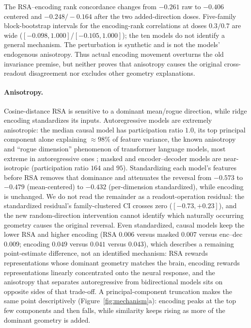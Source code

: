 \documentclass{article}
\begin{document}
The RSA--encoding rank concordance changes from $-0.261$ raw to $-0.406$ centered and
$-0.248/-0.164$ after the two added-direction doses. Five-family block-bootstrap intervals
for the encoding-rank correlations at doses $0.3/0.7$ are wide
($[-0.098,1.000]$/$[-0.105,1.000]$); the ten models do not identify a general mechanism.
The perturbation is synthetic and is not the models' endogenous anisotropy. Thus actual
encoding movement overturns the old invariance premise, but neither proves that anisotropy
causes the original cross-readout disagreement nor excludes other geometry explanations.

\paragraph{Anisotropy.} Cosine-distance RSA is sensitive to a dominant mean/rogue direction, while
ridge encoding standardizes its inputs. Autoregressive models are extremely anisotropic: the median
causal model has participation ratio $1.0$, its top principal component alone explaining
$\approx 98\%$ of feature variance, the known anisotropy and ``rogue dimension'' phenomenon of
transformer language models, most extreme in autoregressive ones \citep{ethayarajh2019contextual,
timkey2021rogue, gao2019degeneration}; masked and
encoder--decoder models are near-isotropic (participation ratio $164$ and $95$). Standardizing each
model's features before RSA removes that dominance and attenuates the reversal from $-0.573$ to
$-0.479$ (mean-centered) to $-0.432$ (per-dimension standardized), while encoding is unchanged. We do
not read the remainder as a readout-operation residual: the standardized residual's
family-clustered CI crosses zero ($[-0.73, +0.23]$), and the new random-direction
intervention cannot identify which naturally occurring geometry causes the original reversal.
Even standardized, causal models keep the lower RSA and higher encoding (RSA $0.006$ versus
masked $0.007$ versus enc--dec $0.009$; encoding $0.049$ versus $0.041$ versus $0.043$), which describes a remaining point-estimate difference, not an identified mechanism: RSA rewards
representations whose dominant geometry matches the brain, encoding rewards representations linearly
concentrated onto the neural response, and the anisotropy that separates autoregressive from
bidirectional models sits on opposite sides of that trade-off. A principal-component truncation
makes the same point descriptively (Figure~\ref{fig:mechanism}a): encoding peaks at the top few
components and then falls, while similarity keeps rising as more of the dominant geometry is added.
\end{document}

